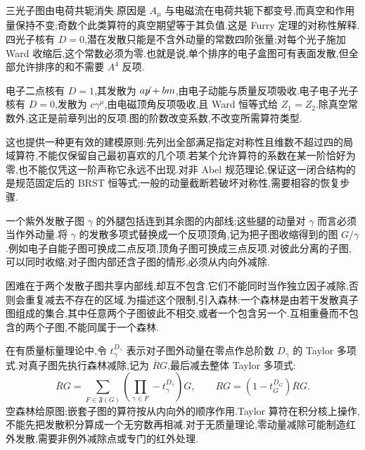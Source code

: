 三光子图由电荷共轭消失.原因是 $A_\mu$ 与电磁流在电荷共轭下都变号,而真空和作用量保持不变;奇数个此类算符的真空期望等于其负值.这是 Furry 定理的对称性解释.四光子核有 $D=0$,潜在发散只能是不含外动量的常数四阶张量;对每个光子施加 Ward 收缩后,这个常数必须为零.也就是说,单个排序的电子盒图可有表面发散,但全部允许排序的和不需要 $A^4$ 反项.

电子二点核有 $D=1$,其发散为 $a\slashed p+bm$,由电子动能与质量反项吸收.电子电子光子核有 $D=0$,发散为 $c\gamma^\mu$,由电磁顶角反项吸收,且 Ward 恒等式给 $Z_1=Z_2$.除真空常数外,这正是前章列出的反项.图的阶数改变系数,不改变所需算符类型.

这也提供一种更有效的建模原则:先列出全部满足指定对称性且维数不超过四的局域算符,不能仅保留自己最初喜欢的几个项.若某个允许算符的系数在某一阶恰好为零,也不能仅凭这一阶声称它永远不出现.对非 Abel 规范理论,保证这一闭合结构的是规范固定后的 BRST 恒等式;一般的动量截断若破坏对称性,需要相容的恢复步骤.


一个紫外发散子图 $\gamma$ 的外腿包括连到其余图的内部线;这些腿的动量对 $\gamma$ 而言必须当作外动量.将 $\gamma$ 的发散多项式替换成一个反项顶角,记为把子图收缩得到的图 $G/\gamma$.例如电子自能子图可换成二点反项,顶角子图可换成三点反项.对彼此分离的子图,可以同时收缩;对子图内部还含子图的情形,必须从内向外减除.

困难在于两个发散子图共享内部线,却互不包含.它们不能同时当作独立因子减除,否则会重复减去不存在的区域.为描述这个限制,引入森林:一个森林是由若干发散真子图组成的集合,其中任意两个子图彼此不相交,或者一个包含另一个.互相重叠而不包含的两个子图,不能同属于一个森林.

在有质量标量理论中,令 $t_\gamma^{D_\gamma}$ 表示对子图外动量在零点作总阶数 $D_\gamma$ 的 Taylor 多项式.对真子图先执行森林减除,记为 $\overline R G$,最后减去整体 Taylor 多项式:
\begin{equation}
 \overline R G=\sum_{F\in\mathfrak F(G)}
       \left(\prod_{\gamma\in F}-t_\gamma^{D_\gamma}\right)G,
 \qquad RG=(1-t_G^{D_G})\overline R G.
 \label{eq:bphz-forest-formula}
\end{equation}
空森林给原图;嵌套子图的算符按从内向外的顺序作用.Taylor 算符在积分核上操作,不能先把发散积分算成一个无穷数再相减.对于无质量理论,零动量减除可能制造红外发散,需要非例外减除点或专门的红外处理.

